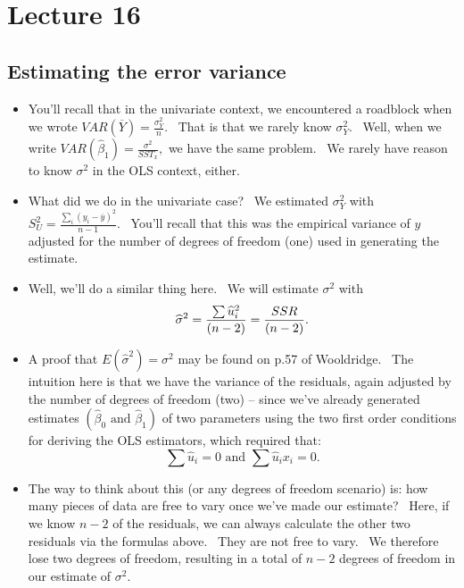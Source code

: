 \documentclass[11pt]{article}
\begin{document}
\section{Lecture 16}

\subsection{Estimating the error variance}

\begin{itemize}
\item You'll recall that in the univariate context, we encountered a
roadblock when we wrote $VAR(\overline{Y})=\frac{\sigma _{Y}^{2}}{n}.$ \
That is that we rarely know $\sigma _{Y}^{2}.$ \ Well, when we write $%
VAR\left( \widehat{\beta }_{1}\right) =\frac{\sigma ^{2}}{SST_{x}},$ we have
the same problem. \ We rarely have reason to know $\sigma ^{2}$ in the OLS
context, either. \ 

\item What did we do in the univariate case? \ We estimated $\sigma _{Y}^{2}$
with $S_{U}^{2}=\frac{\sum\nolimits_{i}\left( y_{i}-\overline{y}\right) ^{2}%
}{n-1}.$ \ You'll recall that this was the empirical variance of $y$
adjusted for the number of degrees of freedom (one) used in generating the
estimate.

\item Well, we'll do a similar thing here. \ We will estimate $\sigma ^{2}$
with 
\begin{equation*}
\widehat{\sigma }^{2}=\frac{\sum \widehat{u}_{i}^{2}}{(n-2)}=\frac{SSR}{%
\left( n-2\right) }.
\end{equation*}

\item A proof that $E(\widehat{\sigma }^{2})=\sigma ^{2}$ may be found on
p.57 of Wooldridge. \ The intuition here is that we have the variance of the
residuals, again adjusted by the number of degrees of freedom (two) -- since
we've already generated estimates $\left( \widehat{\beta }_{0}\text{ and }%
\widehat{\beta }_{1}\right) $ of two parameters using the two first order
conditions for deriving the OLS estimators, which required that:%
\begin{equation*}
\sum \widehat{u}_{i}=0\text{ \ and \ }\sum \widehat{u}_{i}x_{i}=0.
\end{equation*}

\item The way to think about this (or any degrees of freedom scenario) is:
how many pieces of data are free to vary once we've made our estimate? \
Here, if we know $n-2$ of the residuals, we can always calculate the other
two residuals via the formulas above. \ They are not free to vary. \ We
therefore lose two degrees of freedom, resulting in a total of $n-2$ degrees
of freedom in our estimate of $\sigma ^{2}.$


\end{itemize}
\end{document}
